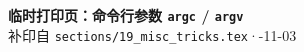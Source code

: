 \documentclass{article}
\begin{document}
	\begin{center}
		{\Large \textbf{临时打印页：命令行参数 \texttt{argc} / \texttt{argv}}} \\[4pt]
		{\small 补印自 \texttt{sections/19\_misc\_tricks.tex}\quad·-11-03}
	\end{center}

	\vspace{0.5em}

	
\end{document}
